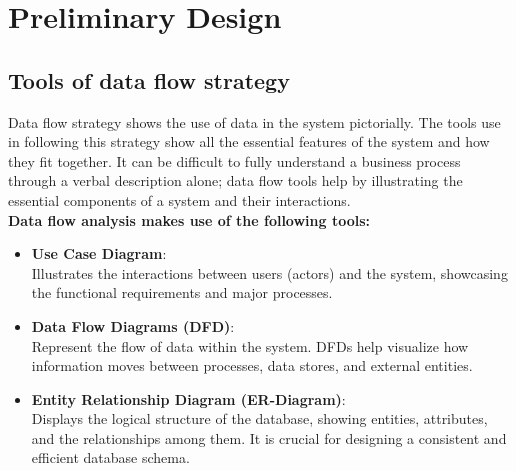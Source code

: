 \chapter{Preliminary  Design}

\section{Tools of data flow strategy}
	Data flow strategy shows the use of data in the system pictorially. The tools
	use in following this strategy show all the essential features of the system and
	how they fit together. It can be difficult to fully understand a business process
	through a verbal description alone; data flow tools help by illustrating the
	essential components of a system and their interactions.\\
\textbf{Data flow analysis makes use of the following tools:}\\

\begin{itemize}
    \item \textbf{Use Case Diagram}:\\
    Illustrates the interactions between users (actors) and the system, showcasing the functional requirements and major processes.

    \item \textbf{Data Flow Diagrams (DFD)}:\\
    Represent the flow of data within the system. DFDs help visualize how information moves between processes, data stores, and external entities.

    \item \textbf{Entity Relationship Diagram (ER-Diagram)}:\\
    Displays the logical structure of the database, showing entities, attributes, and the relationships among them. It is crucial for designing a consistent and efficient database schema.
\end{itemize}

